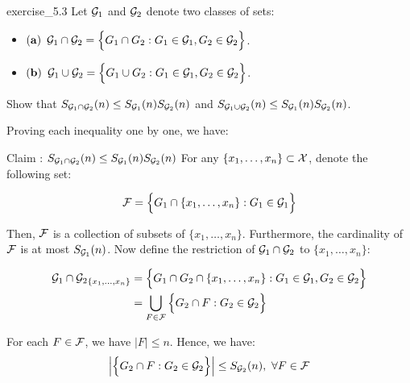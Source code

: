 \begin{exercise}{}{exercise_5.3}
    Let $\mathcal{G}_1$ and $\mathcal{G}_2$ denote two classes of sets:
    \begin{itemize}
        \item ${\bf (a)}$ $\mathcal{G}_1 \cap \mathcal{G}_2=\Big\{ G_1\cap G_2: G_1\in\mathcal{G}_1, G_2 \in\mathcal{G}_2 \Big\}$.
        \item ${\bf (b)}$ $\mathcal{G}_1 \cup \mathcal{G}_2=\Big\{ G_1\cup G_2: G_1\in\mathcal{G}_1, G_2 \in\mathcal{G}_2 \Big\}$.
    \end{itemize}

    Show that $S_{\mathcal{G}_1\cap\mathcal{G}_2}(n) \le S_{\mathcal{G}_1}(n)S_{\mathcal{G}_2}(n)$ and $S_{\mathcal{G}_1\cup\mathcal{G}_2}(n) \le S_{\mathcal{G}_1}(n)S_{\mathcal{G}_2}(n)$.
\end{exercise}

\begin{solution*}
    Proving each inequality one by one, we have:
    \begin{subproof}{\newline Claim : $S_{\mathcal{G}_1 \cap \mathcal{G}_2}(n) \le S_{\mathcal{G}_1}(n)S_{\mathcal{G}_2}(n)$}
        For any $\{x_1, \dots, x_n\} \subset \mathcal{X}$, denote the following set:

        \begin{align*}
            \mathcal{F} = \Big\{ 
                G_1\cap\{x_1, \dots, x_n\} : G_1 \in \mathcal{G}_1
             \Big\}
        \end{align*}

        \noindent Then, $\mathcal{F}$ is a collection of subsets of $\{x_1, \dots, x_n\}$. Furthermore, the cardinality of $\mathcal{F}$ is at most $S_{\mathcal{G}_1}(n)$. Now define the restriction of $\mathcal{G}_1\cap\mathcal{G}_2$ to $\{x_1, \dots, x_n\}$:

        \begin{align*}
            {\mathcal{G}_1 \cap \mathcal{G}_2}_{\{x_1, \dots, x_n \}}
                &= \Big\{ 
                    G_1 \cap G_2 \cap \{ x_1, \dots, x_n \} : G_1 \in \mathcal{G}_1, G_2 \in \mathcal{G}_2
                 \Big\} \\
                &= \bigcup_{F \in \mathcal{F}} \Big\{ 
                    G_2 \cap F : G_2 \in \mathcal{G}_2
                 \Big\}
        \end{align*}

        \noindent For each $F\in\mathcal{F}$, we have $|F| \le n$. Hence, we have:
        \begin{align*}
            \Big| \Big\{ 
                G_2 \cap F : G_2 \in \mathcal{G}_2
             \Big\} \Big| \le S_{\mathcal{G}_2}(n), \ \forall F \in \mathcal{F}
        \end{align*}


\end{subproof}
\end{solution*}
